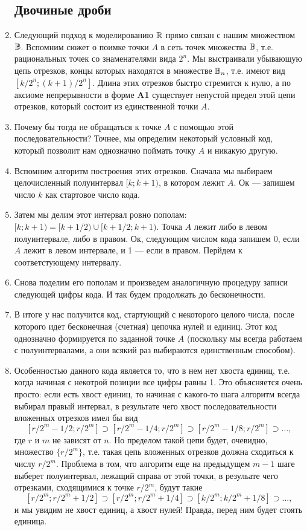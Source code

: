 \begin{enumerate}
\subsection*{Двочиные дроби}

\item Следующий подход к моделированию $\mathbb R$ прямо связан с нашим множеством $\mathbb B$. Вспомним сюжет о поимке точки $A$ в сеть точек множества $\mathbb B$, т.е. рациональных точек со знаменателями вида $2^n$. Мы выстраивали убывающую цепь отрезков, концы которых находятся в множестве $\mathbb B_n$, т.е. имеют вид $[k/2^n;(k+1)/2^n]$. Длина этих отрезков быстро стремится к нулю, а по аксиоме непрерывности в форме \textbf{A1} существует непустой предел этой цепи отрезков, который состоит из единственной точки $A$.
\item Почему бы тогда не обращаться к точке $A$ с помощью этой последовательности? Точнее, мы определим некоторый условный код, который позволит нам однозначно поймать точку $A$ и никакую другую.
\item Вспомним алгоритм построения этих отрезков. Сначала мы выбираем целочисленный полуинтервал $[k;k+1)$, в котором лежит $A$. Ок --- запишем число $k$ как стартовое число кода.
\item Затем мы делим этот интервал ровно пополам: $[k;k+1)=[k+1/2)\cup[k+1/2;k+1)$. Точка $A$ лежит либо в левом полуинтервале, либо в правом. Ок, следующим числом кода запишем 0, если $A$ лежит в левом интервале, и 1 --- если в правом. Перйдем к соответстующему интервалу.
\item Снова поделим его пополам и произведем аналогичную процедуру записи следующей цифры кода. И так будем продолжать до бесконечности.
\item В итоге у нас получится код, стартующий с некоторого целого числа, после которого идет бесконечная (счетная) цепочка нулей и единиц. Этот код однозначно формируется по заданной точке $A$ (поскольку мы всегда работаем с полуинтервалами, а они всякий раз выбираются единственным способом).
\item Особенностью данного кода является то, что в нем нет хвоста единиц, т.е. когда начиная с некотрой позиции все цифры равны 1. Это объясняется очень просто: если есть хвост единиц, то начиная с какого-то шага алгоритм всегда выбирал правый интервал, в результате чего хвост последовательности вложенных отрезков имел бы вид
$$
[r/2^m-1/2;r/2^m]\supset[r/2^m-1/4;r/2^m]\supset[r/2^m-1/8;r/2^m]\supset\dots,
$$
где $r$ и $m$ не зависят от $n$. Но пределом такой цепи будет, очевидно, множество $\{r/2^m\}$, т.е. такая цепь вложенных отрезков должна сходиться к числу $r/2^m$. Проблема в том, что алгоритм еще на предыдущем $m-1$ шаге выберет полуинтервал, лежащий справа от этой точки, в резульате чего отрезками, сходящимися к точке $r/2^m$, будут такие
$$
[r/2^m;r/2^m+1/2]\supset[r/2^m;r/2^m+1/4]\supset[k/2^m;k/2^m+1/8]\supset\dots,
$$
и мы увидим не хвост единиц, а хвост нулей! Правда, перед ним будет стоять единица.


\end{enumerate}

